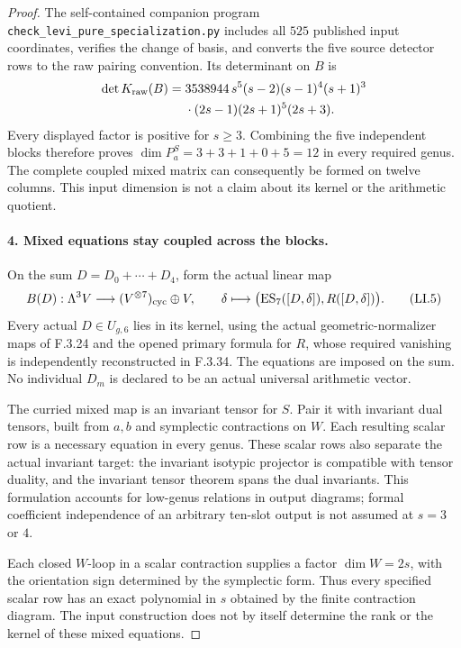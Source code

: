 \begin{proof}
The self-contained companion program
\texttt{check\_levi\_pure\_specialization.py}
includes all $525$ published input coordinates, verifies the
change of basis, and converts the five source detector rows
to the raw pairing convention. Its determinant on $B$ is
\[
\begin{aligned}
 \det K_{\rm raw}(B)
  ={}&3538944\,s^5(s-2)(s-1)^4(s+1)^3\\
    &\cdot(2s-1)(2s+1)^5(2s+3).
\end{aligned}
\]
Every displayed factor is positive for $s\geq3$. Combining the
five independent blocks therefore proves
$\dim P_a^S=3+3+1+0+5=12$ in every required genus.
The complete coupled mixed matrix can consequently be formed
on twelve columns. This input dimension is not a claim about
its kernel or the arithmetic quotient.

\paragraph{4. Mixed equations stay coupled across the blocks.}
On the sum $D=D_0+\cdots+D_4$, form the actual linear map
\[
 B(D):\Lambda^3V\longrightarrow
       (V^{\otimes7})_{\rm cyc}\oplus V,\qquad
 \delta\longmapsto
   \bigl(\operatorname{ES}_7([D,\delta]),R([D,\delta])\bigr).
                                                               \tag{LI.5}
\]
Every actual $D\in U_{g,6}$ lies in its kernel, using the
actual geometric-normalizer maps of F.3.24 and the opened
primary formula for $R$\cite[Proposition~4.1, p.~11]{AuditMoritaSakasaiSuzuki2026v1},
whose required vanishing is independently reconstructed in F.3.34. The equations
are imposed on the sum. No individual $D_m$ is declared
to be an actual universal arithmetic vector.

The curried mixed map is an invariant tensor for $S$.
Pair it with invariant dual tensors, built from $a,b$
and symplectic contractions on $W$. Each resulting scalar
row is a necessary equation in every genus. These scalar
rows also separate the actual invariant target: the
invariant isotypic projector is compatible with tensor
duality, and the invariant tensor theorem spans the dual
invariants. This formulation accounts for low-genus
relations in output diagrams; formal coefficient
independence of an arbitrary ten-slot output is not
assumed at $s=3$ or $4$.

Each closed $W$-loop in a scalar contraction supplies a
factor $\dim W=2s$, with the orientation sign determined
by the symplectic form. Thus every specified scalar
row has an exact polynomial in $s$ obtained by the
finite contraction diagram. The input construction
does not by itself determine the rank or the kernel
of these mixed equations.


\end{proof}

